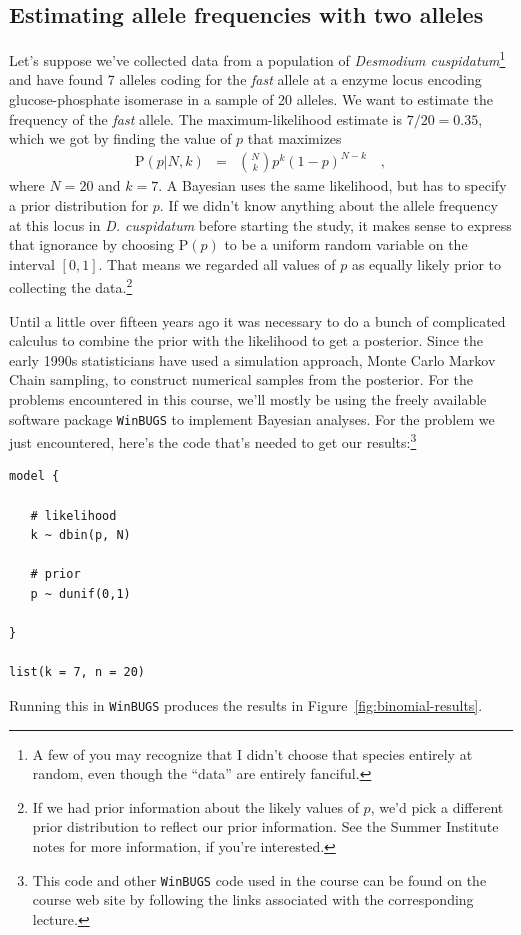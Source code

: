 \documentclass[12pt]{article}
\begin{document}
\subsection*{Estimating allele frequencies with two alleles}

Let's suppose we've collected data from a population of {\it Desmodium
  cuspidatum}\footnote{A few of you may recognize that I didn't choose
  that species entirely at random, even though the ``data'' are
  entirely fanciful.} and have found 7 alleles coding for the {\it
  fast\/} allele at a enzyme locus encoding glucose-phosphate
isomerase in a sample of 20 alleles. We want to estimate the frequency
of the {\it fast\/} allele. The maximum-likelihood estimate is $7/20 =
0.35$, which we got by finding the value of $p$ that maximizes
\begin{eqnarray*}
\mbox{P}(p|N,k) &=& {N \choose k} p^k (1-p)^{N-k} \quad ,
\end{eqnarray*}
where $N=20$ and $k=7$. A Bayesian uses the same likelihood, but has
to specify a prior distribution for $p$. If we didn't know anything
about the allele frequency at this locus in {\it D. cuspidatum} before
starting the study, it makes sense to express that ignorance by
choosing $\mbox{P}(p)$ to be a uniform random variable on the interval
$[0,1]$. That means we regarded all values of $p$ as equally likely
prior to collecting the data.\footnote{If we had prior information
  about the likely values of $p$, we'd pick a different prior
  distribution to reflect our prior information. See the Summer
  Institute notes for more information, if you're interested.}

Until a little over fifteen years ago it was necessary to do a bunch
of complicated calculus to combine the prior with the likelihood to
get a posterior. Since the early 1990s statisticians have used a
simulation approach, Monte Carlo Markov Chain sampling, to construct
numerical samples from the posterior. For the problems encountered in
this course, we'll mostly be using the freely available software
package {\tt WinBUGS} to implement Bayesian analyses. For the problem
we just encountered, here's the code that's needed to get our
results:\footnote{This code and other {\tt WinBUGS} code used in the
  course can be found on the course web site by following the links
  associated with the corresponding
  lecture.}
\begin{verbatim}
model {

   # likelihood
   k ~ dbin(p, N)

   # prior
   p ~ dunif(0,1)

}

list(k = 7, n = 20)
\end{verbatim}
Running this in {\tt WinBUGS} produces the results in
Figure~\ref{fig:binomial-results}.
\end{document}
